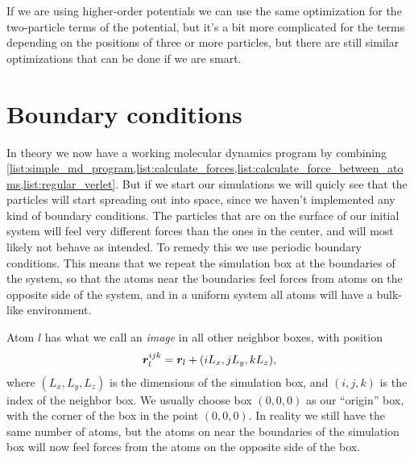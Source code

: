 If we are using higher-order potentials we can use the same optimization for the two-particle terms of the potential, but it's a bit more complicated for the terms depending on the positions of three or more particles, but there are still similar optimizations that can be done if we are smart.




\section{Boundary conditions}
In theory we now have a working molecular dynamics program by combining \cref{list:simple_md_program,list:calculate_forces,list:calculate_force_between_atoms,list:regular_verlet}. But if we start our simulations we will quicly see that the particles will start spreading out into space, since we haven't implemented any kind of boundary conditions. The particles that are on the surface of our initial system will feel very different forces than the ones in the center, and will most likely not behave as intended. To remedy this we use periodic boundary conditions. This means that we repeat the simulation box at the boundaries of the system, so that the atoms near the boundaries feel forces from atoms on the opposite side of the system, and in a uniform system all atoms will have a bulk-like environment. 

Atom $l$ has what we call an \emph{image} in all other neighbor boxes, with position
\begin{align}
    \boldsymbol{r}_l^{ijk} = \boldsymbol{r}_l + (iL_x, jL_y, kL_z),
    \label{eq:pbc_positions}
\end{align}
where $(L_x, L_y, L_z)$ is the dimensions of the simulation box, and $(i, j, k)$ is the index of the neighbor box. We usually choose box $(0,0,0)$ as our ``origin'' box, with the corner of the box in the point $(0,0,0)$. In reality we still have the same number of atoms, but the atoms on near the boundaries of the simulation box will now feel forces from the atoms on the opposite side of the box.


